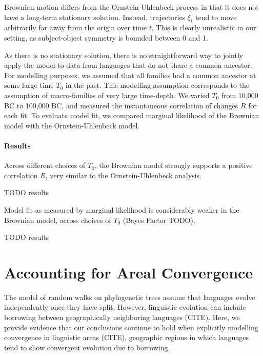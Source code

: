 \documentclass[11pt,a4paper]{article}
\begin{document}
Brownian motion differs from the Ornstein-Uhlenbeck process in that it does not have a long-term stationary solution.
Instead, trajectories $\xi_t$ tend to move arbitrarily far away from the origin over time $t$.
This is clearly unrealistic in our setting, as subject-object symmetry is bounded between 0 and 1.

As there is no stationary solution, there is no straightforward way to jointly apply the model to data from languages that do not share a common ancestor.
For modelling purposes, we assumed that all families had a common ancestor at some large time $T_0$ in the past.
This modelling assumption corresponds to the assumption of macro-families of very large time-depth.
We varied $T_0$ from 10,000 BC to 100,000 BC, and measured the instantaneous correlation of changes $R$ for each fit.
To evaluate model fit, we compared marginal likelihood of the Brownian model with the Ornstein-Uhlenbeck model.

\paragraph{Results}
Across different choices of $T_0$, the Brownian model strongly supports a positive correlation $R$, very similar to the Ornstein-Uhlenbeck analysis.

TODO results

Model fit as measured by marginal likelihood is considerably weaker in the Brownian model, across choices of $T_0$ (Bayes Factor TODO).

TODO results



\section{Accounting for Areal Convergence}
The model of random walks on phylogenetic trees assume that languages evolve independently once they have split.
However, linguistic evolution can include borrowing between geographically neighboring languages (CITE).
Here, we provide evidence that our conclusions continue to hold when explicitly modelling convergence in linguistic areas (CITE), geographic regions in which languages tend to show convergent evolution due to borrowing.
\end{document}
